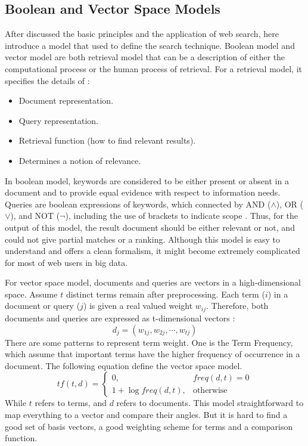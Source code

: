 \documentclass[sigconf]{acmart}
\begin{document}
\subsection{Boolean and Vector Space Models}
After discussed the basic principles and the application of web search, here introduce a model that used to define the search technique. Boolean model and vector model are both retrieval model that can be a description of either the computational process or the human process of retrieval. For a retrieval model, it specifies the details of \cite{editor07}: 
\begin{itemize}
\item Document representation.
\item Query representation.
\item Retrieval function (how to find relevant results).
\item Determines a notion of relevance.
\end{itemize}  

In boolean model, keywords are considered to be either present or absent in a
document and to provide equal evidence with respect to information needs. Queries are boolean expressions of keywords, which connected by AND ($\wedge$), OR ($\vee$), and NOT ($\neg$), including the use of brackets to indicate scope \cite{editor07}. Thus, for the output of this model, the result document should be either relevant or not, and could not give partial matches or a ranking. Although this model is easy to understand and offers a clean formalism, it might become extremely complicated for most of web users in big data.

For vector space model, documents and queries are vectors in a high-dimensional space. Assume $t$ distinct terms remain after preprocessing. Each term ($i$) in a document or query ($j$) is given a real valued weight $w_{ij}$. Therefore, both documents and queries are expressed as t-dimensional vectors \cite{editor07}:
\[d_j=(w_{1j},w_{2j},\cdots,w_{tj})\]
There are some patterns to represent term weight. One is the Term Frequency, which assume that important terms have the higher frequency of occurrence in a document. The following equation define the vector space model.
\[tf(t,d)=
  \begin{cases}
    0, & freq(d,t)=0 \\
    1+\log{freq(d,t)}, & \text{otherwise}
  \end{cases}
\]
While $t$ refers to terms, and $d$ refers to documents. This model straightforward to map everything to a vector and compare their angles. But it is hard to find a good set of basis vectors, a good weighting scheme for terms and a comparison function.
\end{document}
